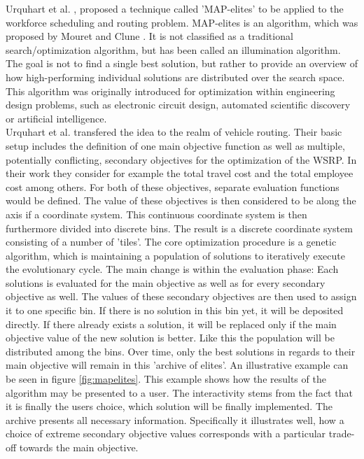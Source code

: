 Urquhart et al. \cite{urquhart_optimisation_2018}, \cite{urquhart_using_2020} proposed a technique called 'MAP-elites' to be applied to the workforce scheduling and routing problem. MAP-elites is an algorithm, which was proposed by Mouret and Clune \cite{mouret_illuminating_2015}. It is not classified as a traditional search/optimization algorithm, but has been called an illumination algorithm. The goal is not to find a single best solution, but rather to provide an overview of how high-performing individual solutions are distributed over the search space. This algorithm was originally introduced for optimization within engineering design problems, such as electronic circuit design, automated scientific discovery or artificial intelligence.\\
Urquhart et al. transfered the idea to the realm of vehicle routing. Their basic setup includes the definition of one main objective function as well as multiple, potentially conflicting, secondary objectives for the optimization of the WSRP. In their work they consider for example the total travel cost and the total employee cost among others. For both of these objectives, separate evaluation functions would be defined. The value of these objectives is then considered to be along the axis if a coordinate system. This continuous coordinate system is then furthermore divided into discrete bins. The result is a discrete coordinate system consisting of a number of 'tiles'. The core optimization procedure is a genetic algorithm, which is maintaining a population of solutions to iteratively execute the evolutionary cycle. The main change is within the evaluation phase: Each solutions is evaluated for the main objective as well as for every secondary objective as well. The values of these secondary objectives are then used to assign it to one specific bin. If there is no solution in this bin yet, it will be deposited directly. If there already exists a solution, it will be replaced only if the main objective value of the new solution is better. Like this the population will be distributed among the bins. Over time, only the best solutions in regards to their main objective will remain in this 'archive of elites'. An illustrative example can be seen in figure \ref{fig:mapelites}. This example shows how the results of the algorithm may be presented to a user. The interactivity stems from the fact that it is finally the users choice, which solution will be finally implemented. The archive presents all necessary information. Specifically it illustrates well, how a choice of extreme secondary objective values corresponds with a particular trade-off towards the main objective.\\ \\
